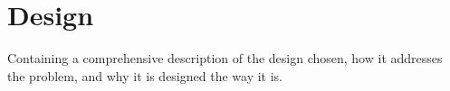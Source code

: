 \chapter{Design}

Containing a comprehensive description of the design chosen, how it addresses the problem, and why it is designed the way it is.